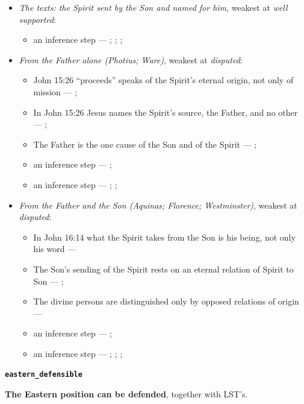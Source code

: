 \documentclass[11pt,paper=\testimonypaper,DIV=13,parskip=false]{scrartcl}
\begin{document}
\begin{itemize}
\item \emph{The texts: the Spirit sent by the Son and named for him}, weakest at \emph{well supported}:
\begin{itemize}
\item an inference step --- \cite[3, The Triune God]{kibbey-living-systematic-theology-2026}; \cite{photius-mystagogy-1987}; \cite[178]{vischer-spirit-of-god-1981}; \cite[I, q. 36, a. 2]{aquinas-summa-1920}
\end{itemize}
\item \emph{From the Father alone (Photius; Ware)}, weakest at \emph{disputed}:
\begin{itemize}
\item John 15:26 “proceeds” speaks of the Spirit’s eternal origin, not only of mission --- \cite[I, q. 36, a. 2]{aquinas-summa-1920}; \cite{photius-mystagogy-1987}
\item In John 15:26 Jesus names the Spirit’s source, the Father, and no other --- \cite{photius-mystagogy-1987}; \cite{ware-orthodox-church-1993}
\item The Father is the one cause of the Son and of the Spirit --- \cite{photius-mystagogy-1987}; \cite{ware-orthodox-church-1993}
\item an inference step --- \cite{photius-mystagogy-1987}; \cite[I, q. 36, a. 2]{aquinas-summa-1920}
\item an inference step --- \cite[Florence, Session 6 (1439), Laetentur caeli]{tanner-decrees-1990}; \cite{pcpcu-greek-latin-traditions-1995}; \cite{photius-mystagogy-1987}
\end{itemize}
\item \emph{From the Father and the Son (Aquinas; Florence; Westminster)}, weakest at \emph{disputed}:
\begin{itemize}
\item In John 16:14 what the Spirit takes from the Son is his being, not only his word --- \cite[I, q. 36, a. 2]{aquinas-summa-1920}
\item The Son’s sending of the Spirit rests on an eternal relation of Spirit to Son --- \cite[I, q. 36, a. 2]{aquinas-summa-1920}; \cite[165]{vischer-spirit-of-god-1981}
\item The divine persons are distinguished only by opposed relations of origin --- \cite[I, q. 36, a. 2]{aquinas-summa-1920}
\item an inference step --- \cite[I, q. 36, a. 2]{aquinas-summa-1920}; \cite{photius-mystagogy-1987}
\item an inference step --- \cite[165--169]{vischer-spirit-of-god-1981}; \cite[144]{vischer-spirit-of-god-1981}; \cite[183--184]{vischer-spirit-of-god-1981}; \cite[I, q. 43, a. 8]{aquinas-summa-1920}
\end{itemize}
\end{itemize}
\par\medskip\noindent\textbf{\texttt{eastern\_\allowbreak{}defensible}}\par\nobreak\noindent
\textbf{The Eastern position can be defended}, together with LST’s.
\end{document}
